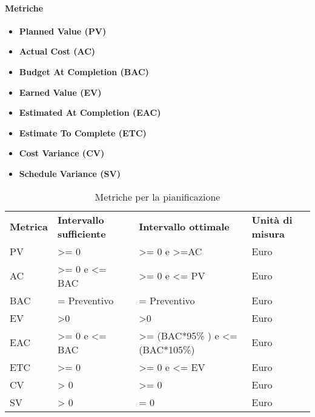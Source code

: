 \paragraph{Metriche}
\begin{itemize}
	\item \textbf{Planned Value (PV)}
	\item \textbf{Actual Cost (AC)}
	\item \textbf{Budget At Completion (BAC)}
	\item \textbf{Earned Value (EV)}
	\item \textbf{Estimated At Completion (EAC)}
	\item \textbf{Estimate To Complete (ETC)}
	\item \textbf{Cost Variance	(CV)}
	\item \textbf{Schedule Variance	(SV)}
\end{itemize}

\renewcommand{\arraystretch}{2.2}
\begin{longtable}{|C{2cm}|C{3.5cm}|C{3.5cm}|C{3cm}|}

	\caption{Metriche per la pianificazione }\\
	\hline

	\textbf{Metrica} & \textbf{Intervallo sufficiente}  & \textbf{Intervallo ottimale} & \textbf{Unità di misura}
	\tabularnewline
	\endfirsthead

	PV & >= 0 & >= 0 e >=AC & Euro \\
	AC & >= 0 e <= BAC & >= 0 e <= PV & Euro \\
	BAC & = Preventivo  & = Preventivo & Euro \\
	EV & >0  & >0 & Euro \\
	EAC &  >= 0 e <= BAC& >= (BAC*95\% ) e <= (BAC*105\%)& Euro \\
	ETC & >= 0 & >= 0 e <= EV & Euro \\
	CV & > 0 & >= 0 & Euro \\
	SV & > 0 & = 0 & Euro \\
\end{longtable}
